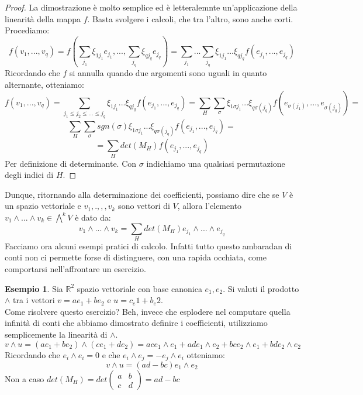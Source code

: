 \documentclass[12pt,a4paper]{report}
\theoremstyle{definition}
\theoremstyle{Theorem}
\theoremstyle{definition}
\newtheorem{Ex}[Def]{Esempio}
\theoremstyle{definition}
\theoremstyle{definition}
\begin{document}
\begin{proof}
	La dimostrazione è molto semplice ed è letteralemnte un'applicazione della linearità della mappa $f$. Basta svolgere i calcoli, che tra l'altro, sono anche corti. Procediamo:
	$$f(v_1,...,v_q)=f(\sum_{j_1}\xi_{1j_1}e_{j_1},...,\sum_{j_q}\xi_{qj_q}e_{j_q})=\sum_{j_1}...\sum_{j_q}\xi_{1j_1}...\xi_{qj_q}f(e_{j_1},...,e_{j_q})$$
	Ricordando che $f$ si annulla quando due argomenti sono uguali in quanto alternante, otteniamo:
	$$f(v_1,...,v_q)=\sum_{j_1\le j_2\le...\le j_q}\xi_{1j_1}...\xi_{qj_q}f(e_{j_1},...,e_{j_q})=
	\sum_{H}\sum_{\sigma}\xi_{1\sigma{j_1}}...\xi_{q\sigma(j_q)}f(e_{\sigma(j_1)},...,e_{\sigma(j_q)})=$$
	$$\sum_{H}\sum_{\sigma}sgn(\sigma)\xi_{1\sigma{j_1}}...\xi_{q\sigma(j_q)}f(e_{j_1},...,e_{j_q})=$$
	$$
	=\sum_{H}det(M_H)f(e_{j_1},...,e_{j_q})$$
	Per definizione di determinante. Con $\sigma$ indichiamo una qualsiasi permutazione degli indici di $H$.
\end{proof}
Dunque, ritornando alla determinazione dei coefficienti, possiamo dire che se $V$ è un spazio vettoriale e $v_1,.,,,v_k$ sono vettori di $V$, allora l'elemento $v_1\wedge...\wedge v_k\in \bigwedge^kV$ è dato da:
$$v_1\wedge...\wedge v_k=\sum_{H}det(M_H)e_{j_1}\wedge...\wedge e_{j_q}$$
Facciamo ora alcuni esempi pratici di calcolo. Infatti tutto questo ambaradan di conti non ci permette forse di distinguere, con una rapida occhiata, come comportarsi nell'affrontare un esercizio.
\begin{Ex}
	Sia $\mathbb{R}^2$ spazio vettoriale con base canonica $e_1,e_2$. Si valuti il prodotto $\wedge$ tra i vettori $v=ae_1+be_2$ e $u=c_e1+b_e2$.\\
	Come risolvere questo esercizio? Beh, invece che esplodere nel computare quella infinità di conti che abbiamo dimostrato definire i coefficienti, utilizziamo semplicemente la linearità di $\wedge$.
	$$v\wedge u=(ae_1+be_2)\wedge(ce_1+de_2)=ace_1\wedge e_1+ade_1\wedge e_2+bce_2\wedge e_1+bde_2\wedge e_2$$ 
	Ricordando che $e_i\wedge e_i=0$ e che $e_i\wedge e_j=-e_j\wedge e_i$ otteniamo:
	$$v\wedge u=(ad-bc)e_1\wedge e_2$$
	Non a caso $det(M_H)=det\begin{pmatrix}
		a&b\\c&d
	\end{pmatrix}=ad-bc$
\end{Ex}
\end{document}
